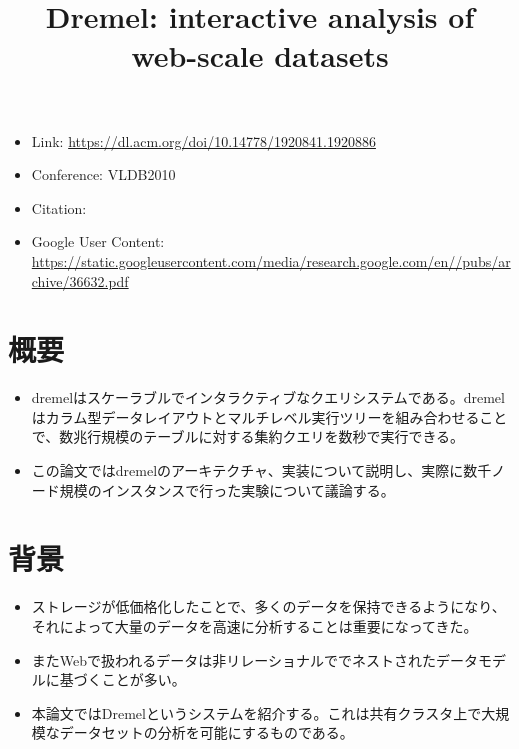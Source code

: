 \documentclass[dvipdfmx,uplatex]{jsarticle}
\title{Dremel: interactive analysis of web-scale datasets}
\author{\empty}
\date{\empty}
\theoremstyle{remark}
\newenvironment{simplebox}{
    \begin{tcolorbox}[
        fonttitle=\bfseries,
    ]
}{
    \end{tcolorbox}
}
\begin{document}
\maketitle

\begin{itemize}
    \item Link: \url{https://dl.acm.org/doi/10.14778/1920841.1920886}
    \item Conference: VLDB2010
    \item Citation: \cite{dremel_2010}
    \item Google User Content: \url{https://static.googleusercontent.com/media/research.google.com/en//pubs/archive/36632.pdf}
\end{itemize}

\section{概要}
\begin{simplebox}
\begin{itemize}
    \item dremelはスケーラブルでインタラクティブなクエリシステムである。dremelはカラム型データレイアウトとマルチレベル実行ツリーを組み合わせることで、数兆行規模のテーブルに対する集約クエリを数秒で実行できる。
    \item この論文ではdremelのアーキテクチャ、実装について説明し、実際に数千ノード規模のインスタンスで行った実験について議論する。
\end{itemize}
\end{simplebox}

\section{背景}
\begin{simplebox}
\begin{itemize}
    \item ストレージが低価格化したことで、多くのデータを保持できるようになり、それによって大量のデータを高速に分析することは重要になってきた。
    \item またWebで扱われるデータは非リレーショナルででネストされたデータモデルに基づくことが多い。
    \item 本論文ではDremelというシステムを紹介する。これは共有クラスタ上で大規模なデータセットの分析を可能にするものである。
\end{itemize}
\end{simplebox}
\end{document}
